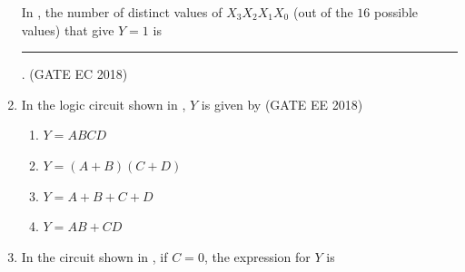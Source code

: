 \begin{enumerate}[label=\arabic*.,ref=\theenumi]
In
,
the number of distinct values of $X_3X_2X_1X_0$ (out of the $16$ possible values) that give $Y=1$ is \rule{1cm}{0.5pt}.
\hfill(GATE EC 2018)
\begin{figure}[H]
\centering
\resizebox{0.75\columnwidth}{!}{%

	}
	\caption{}
\label{fig:GATE-EE 2018,47}
\end{figure}
\item In the logic circuit shown in  
,
	$Y$ is given by
\hfill(GATE EE 2018)
\begin{figure}[H]
\centering
\resizebox{0.5\columnwidth}{!}{%

	}
	\caption{}
\label{fig:GATE-EE 2018,14}
\end{figure}
\begin{enumerate}
    \item $Y = ABCD$
    \item $Y = ( A + B)(C + D) $
    \item $Y = A +B +C+ D$
    \item $Y = AB+CD $
    
\end{enumerate}

\item In the circuit shown in 
,
 if $C = 0$, the expression for $Y$ is


\end{enumerate}
